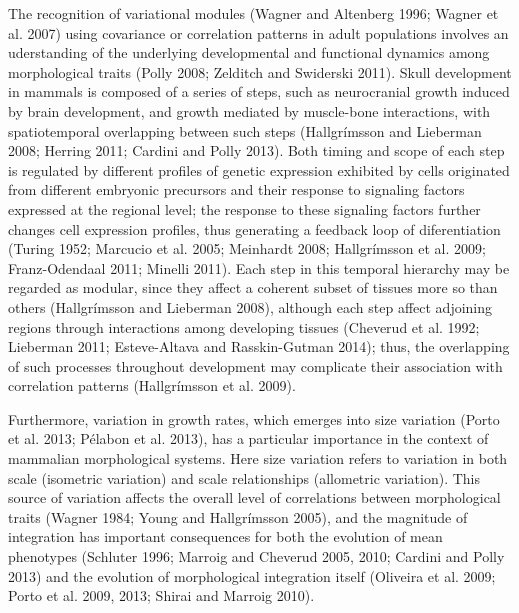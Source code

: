 \documentclass[12pt,]{article}
\begin{document}
The recognition of variational modules (Wagner and Altenberg 1996;
Wagner et al. 2007) using covariance or correlation patterns in adult
populations involves an uderstanding of the underlying developmental and
functional dynamics among morphological traits (Polly 2008; Zelditch and
Swiderski 2011). Skull development in mammals is composed of a series of
steps, such as neurocranial growth induced by brain development, and
growth mediated by muscle-bone interactions, with spatiotemporal
overlapping between such steps (Hallgrímsson and Lieberman 2008; Herring
2011; Cardini and Polly 2013). Both timing and scope of each step is
regulated by different profiles of genetic expression exhibited by cells
originated from different embryonic precursors and their response to
signaling factors expressed at the regional level; the response to these
signaling factors further changes cell expression profiles, thus
generating a feedback loop of diferentiation (Turing 1952; Marcucio et
al. 2005; Meinhardt 2008; Hallgrímsson et al. 2009; Franz-Odendaal 2011;
Minelli 2011). Each step in this temporal hierarchy may be regarded as
modular, since they affect a coherent subset of tissues more so than
others (Hallgrímsson and Lieberman 2008), although each step affect
adjoining regions through interactions among developing tissues
(Cheverud et al. 1992; Lieberman 2011; Esteve-Altava and Rasskin-Gutman
2014); thus, the overlapping of such processes throughout development
may complicate their association with correlation patterns (Hallgrímsson
et al. 2009).

Furthermore, variation in growth rates, which emerges into size
variation (Porto et al. 2013; Pélabon et al. 2013), has a particular
importance in the context of mammalian morphological systems. Here size
variation refers to variation in both scale (isometric variation) and
scale relationships (allometric variation). This source of variation
affects the overall level of correlations between morphological traits
(Wagner 1984; Young and Hallgrímsson 2005), and the magnitude of
integration has important consequences for both the evolution of mean
phenotypes (Schluter 1996; Marroig and Cheverud 2005, 2010; Cardini and
Polly 2013) and the evolution of morphological integration itself
(Oliveira et al. 2009; Porto et al. 2009, 2013; Shirai and Marroig
2010).
\end{document}
